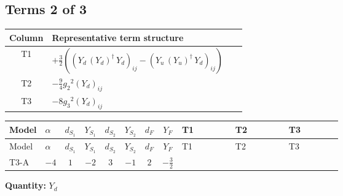 \documentclass[8pt]{article}
\begin{document}
\begin{landscape}
\subsection*{Terms 2 of 3}
\begin{center}
\begin{tabular}{@{}c >{\raggedright\arraybackslash}p{0.82\linewidth}@{}}
\toprule
Column & Representative term structure \\
\midrule
T1 & \(\displaystyle +\frac{3}{2} (\left({Y_d}\,\left({Y_d}\right)^{\dagger}\,{Y_d}\right)_{ij}-\left({Y_u}\,\left({Y_u}\right)^{\dagger}\,{Y_d}\right)_{ij})\) \\
\midrule
T2 & \(\displaystyle -\frac{9}{4} {g_2}^2 \left({Y_d}\right)_{ij}\) \\
\midrule
T3 & \(\displaystyle -8 {g_3}^2 \left({Y_d}\right)_{ij}\) \\
\midrule
\bottomrule
\end{tabular}
\end{center}
\smallskip
\tiny
\begin{longtable}{@{}llcccccc >{\raggedright\arraybackslash}p{0.21\linewidth} >{\raggedright\arraybackslash}p{0.21\linewidth} >{\raggedright\arraybackslash}p{0.21\linewidth}@{}}
\toprule
Model & $\alpha$ & $d_{S_1}$ & $Y_{S_1}$ & $d_{S_2}$ & $Y_{S_2}$ & $d_F$ & $Y_F$ & T1 & T2 & T3 \\
\midrule
\endfirsthead
\toprule
Model & $\alpha$ & $d_{S_1}$ & $Y_{S_1}$ & $d_{S_2}$ & $Y_{S_2}$ & $d_F$ & $Y_F$ & T1 & T2 & T3 \\
\midrule
\endhead
T3-A & $-4$ & $1$ & $-2$ & $3$ & $-1$ & $2$ & $-\frac{3}{2}$ & \scriptsize\adjustbox{max width=\linewidth}{$\begin{gathered} +\frac{3}{2} (\left({Y_d}\,\left({Y_d}\right)^{\dagger}\,{Y_d}\right)_{ij}-\left({Y_u}\,\left({Y_u}\right)^{\dagger}\,{Y_d}\right)_{ij})\end{gathered}$} & \scriptsize\adjustbox{max width=\linewidth}{$\begin{gathered} -\frac{9}{4} {g_2}^2 \left({Y_d}\right)_{ij}\end{gathered}$} & \scriptsize\adjustbox{max width=\linewidth}{$\begin{gathered} -8 {g_3}^2 \left({Y_d}\right)_{ij}\end{gathered}$} \\
\midrule
\bottomrule
\end{longtable}
\clearpage
\noindent\textbf{Quantity: }$Y_d$\par\smallskip

\end{landscape}
\end{document}
